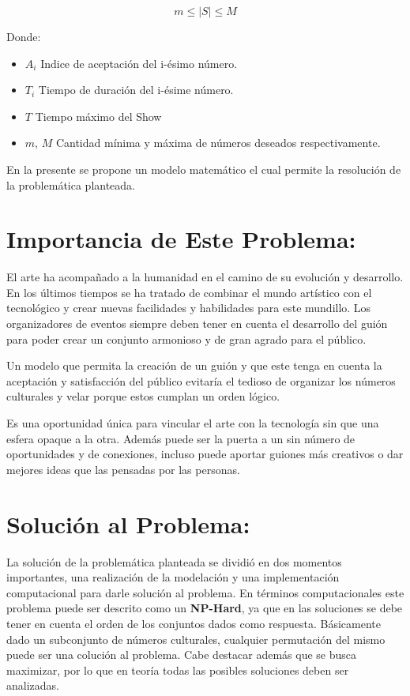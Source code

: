 \documentclass{article}
\begin{document}
\begin{equation*}
    m \leq |S| \leq M
\end{equation*}

\newpage

Donde: \begin{itemize}
    \item $A_i$ Indice de aceptaci\'on del i-\'esimo n\'umero.
    \item $T_i$ Tiempo de duraci\'on del i-\'esime n\'umero.
    \item $T$ Tiempo m\'aximo del Show
    \item $m$, $M$ Cantidad m\'inima y m\'axima de n\'umeros deseados respectivamente.
\end{itemize}

En la presente se propone un modelo matem\'atico el cual permite la resoluci\'on de 
la problem\'atica planteada.  

\section*{Importancia de Este Problema:}

El arte ha acompa\~nado a la humanidad en el camino de su evoluci\'on y desarrollo. 
En los \'ultimos tiempos se ha tratado de combinar el mundo art\'istico con el tecnol\'ogico 
y crear nuevas facilidades y habilidades para este mundillo. Los organizadores de eventos 
siempre deben tener en cuenta el desarrollo del gui\'on para poder crear un conjunto armonioso
y de gran agrado para el p\'ublico.

Un modelo que permita la creaci\'on de un gui\'on y que este tenga en cuenta la aceptaci\'on 
y satisfacci\'on del p\'ublico evitar\'ia el tedioso de organizar los n\'umeros culturales
y velar porque estos cumplan un orden l\'ogico. 

Es una oportunidad \'unica para vincular el arte con la tecnolog\'ia sin que una esfera opaque a la otra.
Adem\'as puede ser la puerta a un sin n\'umero de oportunidades y de conexiones, incluso puede aportar 
guiones m\'as creativos o dar mejores ideas que las pensadas por las personas.

\section*{Soluci\'on al Problema:}

La soluci\'on de la problem\'atica planteada se dividi\'o en dos momentos importantes, una realizaci\'on 
de la modelaci\'on y una implementaci\'on computacional para darle soluci\'on al problema. En t\'erminos
computacionales este problema puede ser descrito como un \textbf{NP-Hard}, ya que en las soluciones se 
debe tener en cuenta el orden de los conjuntos dados como respuesta. B\'asicamente dado un subconjunto
de n\'umeros culturales, cualquier permutaci\'on del mismo puede ser una coluci\'on al problema. Cabe 
destacar adem\'as que se busca maximizar, por lo que en teor\'ia todas las posibles soluciones deben
ser analizadas.
\end{document}
